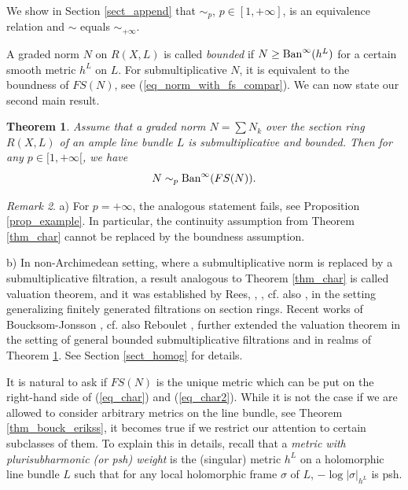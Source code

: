 \documentclass[12pt]{article}
\numberwithin{equation}{section}
\theoremstyle{theorem}
\newtheorem{thm}{Theorem}[section]
\theoremstyle{definition}
\theoremstyle{remark}
\newtheorem{rem}[thm]{Remark}
\begin{document}
	We show in Section \ref{sect_append} that $\sim_p$, $p \in [1, +\infty]$, is an equivalence relation and $\sim$ equals $\sim_{+ \infty}$. 
	\par 
	A graded norm $N$ on $R(X, L)$ is called \textit{bounded} if $N \geq {\rm{Ban}}^{\infty}(h^L)$ for a certain smooth metric $h^L$ on $L$.
	For submultiplicative $N$, it is equivalent to the boundness of $FS(N)$, see (\ref{eq_norm_with_fs_compar}).
	We can now state our second main result.
	\begin{thm}\label{thm_char2}
		Assume that a graded norm $N = \sum N_k$ over the section ring $R(X, L)$ of an ample line bundle $L$ is submultiplicative and bounded.
		Then for any $p \in [1, + \infty[$, we have
		\begin{equation}\label{eq_char2}
			N \sim_p {\rm{Ban}}^{\infty}(FS(N)).
		\end{equation}
	\end{thm}
	\begin{rem}\label{rem_char2}
		a) For $p = + \infty$, the analogous statement fails, see Proposition \ref{prop_example}.
		In particular, the continuity assumption from Theorem \ref{thm_char} cannot be replaced by the boundness assumption.
		\par 
		b) 
		In non-Archimedean setting, where a submultiplicative norm is replaced by a submultiplicative filtration, a result analogous to Theorem \ref{thm_char} is called valuation theorem, and it was established by Rees, \cite{ReesValI}, \cite{ReesValII}, cf. also \cite[\S 4.1, \S 5.3]{ReesBook}, in the setting generalizing finitely generated filtrations on section rings. 
		Recent works of Boucksom-Jonsson \cite[Theorems D and 2.26]{BouckJohn21}, cf. also Reboulet \cite{Reboulet21}, further extended the valuation theorem in the setting of general bounded submultiplicative filtrations and in realms of Theorem \ref{thm_char2}. See Section \ref{sect_homog} for details.
	\end{rem}
	\par 
	It is natural to ask if $FS(N)$ is the unique metric which can be put on the right-hand side of (\ref{eq_char}) and (\ref{eq_char2}).
	While it is not the case if we are allowed to consider arbitrary metrics on the line bundle, see Theorem \ref{thm_bouck_erikss}, it becomes true if we restrict our attention to certain subclasses of them.
	To explain this in details, recall that a \textit{metric with plurisubharmonic (or psh) weight} is the (singular) metric $h^L$ on a holomorphic line bundle $L$ such that for any local holomorphic frame $\sigma$ of $L$, $- \log |\sigma|_{h^L}$ is psh.
\end{document}
